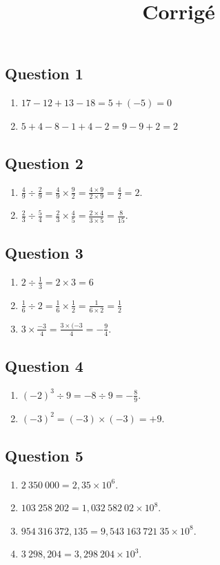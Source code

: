 \documentclass[12 pt]{extarticle}
\title{Corrigé}
\date{}
\theoremstyle{plain}
\begin{document}
	\subsection*{Question 1}
	\begin{enumerate}
\item	$17-12+13-18 = 5 + (-5) = 0$ 
 \item $5+4-8- 1+4 - 2 = 9 - 9 + 2 = 2$
 \end{enumerate}
 \subsection*{Question 2}
 \begin{enumerate}
 \item $\frac49\div\frac29 = \frac49 \times \frac92  = \frac{4\times 9}{2\times 9} = \frac42 = 2$. 
 \item $\frac23\div\frac54 = \frac23\times \frac45 = \frac{2\times 4}{3\times 5} = \frac8{15}$.  
 \end{enumerate}
 \subsection*{Question 3}
\begin{enumerate} \item $2\div \frac13 = 2 \times 3 = 6$
\item $\frac16\div 2 = \frac16\times \frac12 = \frac1{6\times 2} = \frac12$
\item $3\times \frac{-3}4= \frac{3\times (-3}4 = - \frac94$.
\end{enumerate}
\subsection*{Question 4}
\begin{enumerate}
\item $(-2)^3\div 9 = - 8\div 9 = -\frac89$.
\item $(-3)^2 = (-3)\times(-3)=+9$.
\end{enumerate}

\subsection*{Question 5}
\begin{enumerate}
\item $2~350~000= 2,35\times 10^6$.
\item $103~258~202 = 1,032~582~02 \times 10^8$. 
\item $954~316~372,135 = 9,543~163~721~35\times 10^8$.
\item $3~298,204 = 3,298~204 \times 10^3$. 
\end{enumerate}
\end{document}
